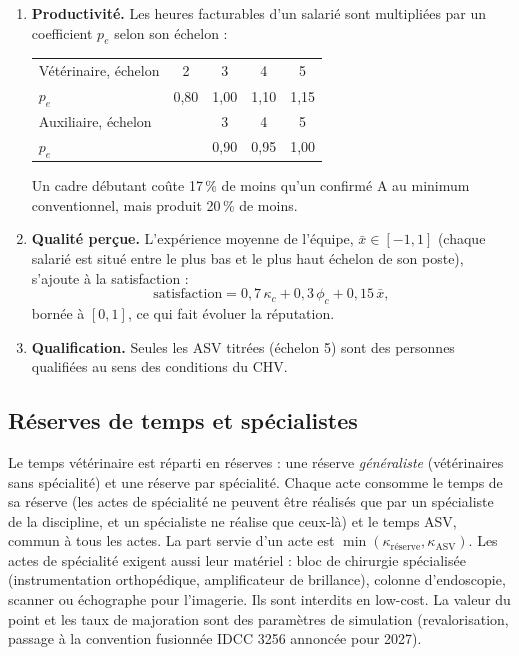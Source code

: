 \documentclass[11pt,a4paper]{article}
\begin{document}
\begin{enumerate}
  \item \textbf{Productivité.} Les heures facturables d'un salarié sont
    multipliées par un coefficient $p_e$ selon son échelon :
    \begin{center}
    \begin{tabular}{@{}lcccc@{}}
    \toprule
    Vétérinaire, échelon & 2 & 3 & 4 & 5 \\
    $p_e$ & 0,80 & 1,00 & 1,10 & 1,15 \\
    \midrule
    Auxiliaire, échelon & & 3 & 4 & 5 \\
    $p_e$ & & 0,90 & 0,95 & 1,00 \\
    \bottomrule
    \end{tabular}
    \end{center}
    Un cadre débutant coûte 17\,\% de moins qu'un confirmé A au minimum
    conventionnel, mais produit 20\,\% de moins.
  \item \textbf{Qualité perçue.} L'expérience moyenne de l'équipe,
    $\bar{x} \in [-1, 1]$ (chaque salarié est situé entre le plus bas et le
    plus haut échelon de son poste), s'ajoute à la satisfaction :
    \[
      \text{satisfaction} = 0{,}7\,\kappa_c + 0{,}3\,\phi_c + 0{,}15\,\bar{x},
    \]
    bornée à $[0, 1]$, ce qui fait évoluer la réputation.
  \item \textbf{Qualification.} Seules les ASV titrées (échelon 5) sont des
    personnes qualifiées au sens des conditions du CHV.
\end{enumerate}

\subsection{Réserves de temps et spécialistes}

Le temps vétérinaire est réparti en réserves : une réserve
\emph{généraliste} (vétérinaires sans spécialité) et une réserve par
spécialité. Chaque acte consomme le temps de sa réserve (les actes de
spécialité ne peuvent être réalisés que par un spécialiste de la
discipline, et un spécialiste ne réalise que ceux-là) et le temps ASV,
commun à tous les actes. La part servie d'un acte est
$\min(\kappa_{\text{réserve}}, \kappa_{\text{ASV}})$. Les actes de
spécialité exigent aussi leur matériel : bloc de chirurgie spécialisée
(instrumentation orthopédique, amplificateur de brillance), colonne
d'endoscopie, scanner ou échographe pour l'imagerie. Ils sont interdits en
low-cost. La valeur du point et les taux de majoration sont des paramètres
de simulation (revalorisation, passage à la convention fusionnée IDCC 3256
annoncée pour 2027).
\end{document}
